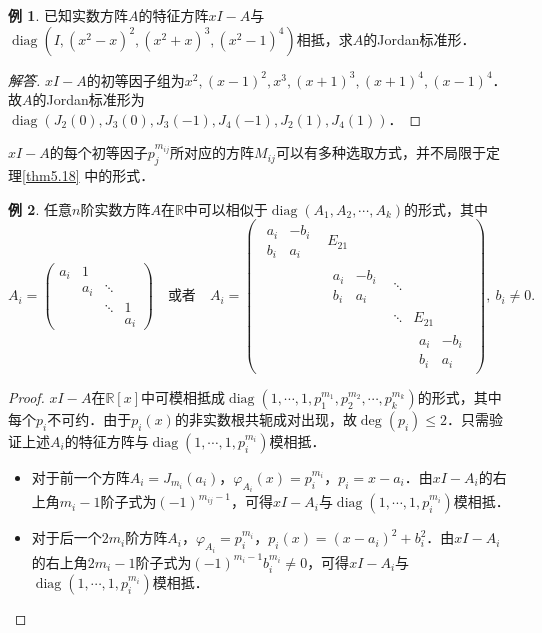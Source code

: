 \documentclass[a4paper,fontset=windows]{ctexbook}
\theoremstyle{definition}
\newtheorem{example}{例}[chapter]
\DeclareMathOperator{\diag}{diag}
\renewcommand{\le}{\leqslant}
\begin{document}
\begin{example}
已知实数方阵$A$的特征方阵$xI-A$与$\diag(I,(x^2-x)^2,(x^2+x)^3,(x^2-1)^4)$相抵，求$A$的Jordan标准形．
\end{example}

\begin{proof}[解答]
$xI-A$的初等因子组为$x^2,(x-1)^2,x^3,(x+1)^3,(x+1)^4,(x-1)^4$．故$A$的Jordan标准形为$\diag(J_2(0),J_3(0),J_3(-1),J_4(-1),J_2(1),J_4(1))$．
\end{proof}

$xI-A$的每个初等因子$p_j^{m_{ij}}$所对应的方阵$M_{ij}$可以有多种选取方式，并不局限于定理\ref{thm5.18} 中的形式．

\begin{example}\label{ex5.21}
任意$n$阶实数方阵$A$在$\mathbb{R}$中可以相似于$\diag(A_1,A_2,\cdots,A_k)$的形式，其中
$$A_i=\begin{pmatrix}a_i&1&& \\ &a_i&\ddots& \\ &&\ddots&1 \\ &&&a_i\end{pmatrix}\quad\text{或者}\quad A_i=\begin{pmatrix}\begin{smallmatrix}a_i&-b_i \\ b_i&a_i\end{smallmatrix}&E_{21}&& \\ &\begin{smallmatrix}a_i&-b_i \\ b_i&a_i\end{smallmatrix}&\ddots& \\ &&\ddots&E_{21} \\ &&&\begin{smallmatrix}a_i&-b_i \\ b_i&a_i\end{smallmatrix}\end{pmatrix},~b_i\ne 0.$$
\end{example}

\begin{proof}
$xI-A$在$\mathbb{R}[x]$中可模相抵成$\diag(1,\cdots,1,p_1^{m_1},p_2^{m_2},\cdots,p_k^{m_k})$的形式，其中每个$p_i$不可约．由于$p_i(x)$的非实数根共轭成对出现，故$\deg(p_i)\le 2$．只需验证上述$A_i$的特征方阵与$\diag(1,\cdots,1,p_i^{m_i})$模相抵．
\begin{itemize}
\item 对于前一个方阵$A_i=J_{m_i}(a_i)$，$\varphi_{A_i}(x)=p_i^{m_i}$，$p_i=x-a_i$．由$xI-A_i$的右上角$m_i-1$阶子式为$(-1)^{m_{ij}-1}$，可得$xI-A_i$与$\diag(1,\cdots,1,p_i^{m_i})$模相抵．
\item 对于后一个$2m_i$阶方阵$A_i$，$\varphi_{A_i}=p_i^{m_i}$，$p_i(x)=(x-a_i)^2+b_i^2$．由$xI-A_i$的右上角$2m_i-1$阶子式为$(-1)^{m_i-1}b_i^{m_i}\ne 0$，可得$xI-A_i$与$\diag(1,\cdots,1,p_i^{m_i})$模相抵．\qedhere
\end{itemize}
\end{proof}
\end{document}
